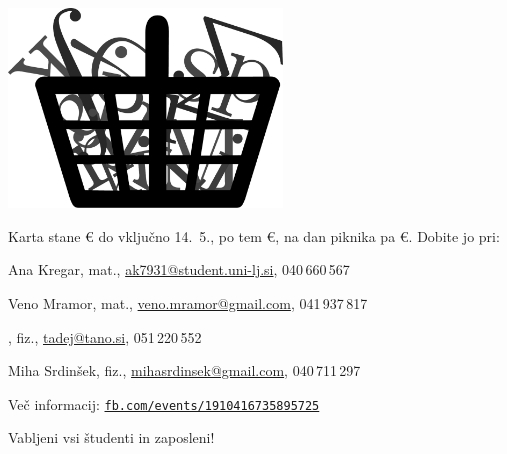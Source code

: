 \documentclass[a4paper,oneside,12pt]{article}
\title{\Title}
\author{\Author}
\date{\today}
\theoremstyle{definition}
\newenvironment{itemize*}{\vspace{-6pt}\begin{itemize}\setlength{\itemsep}{0pt}\setlength{\parskip}{2pt}}{\end{itemize}}
\begin{document}
\vspace*{-10ex}

\begin{center}
\fontsize{64}{64}\selectfont
{}\scalebox{2.6}{$\boldsymbol \varphi$}\textbf{} \\[28px]

\vspace*{1ex}

\fontsize{36}{55}\selectfont
{}\mbox{
 }

\fontsize{32}{36}\selectfont

\vspace*{-0.5ex}
\includegraphics[height=150pt]{piknik_logo.pdf}

\vspace{-1ex}
\begin{flushleft}
  Karta stane \unit[10]{\euro} do vključno 14.~5., po tem
  \unit[12]{\euro}, na dan piknika pa \unit[15]{\euro}. Dobite jo pri:
\end{flushleft}
\fontsize{18}{20}\selectfont
\vspace{-3.5ex}
\begin{itemize*}
  \item Ana Kregar, mat.,
    \href{mailto:ak7931@student.uni-lj.si}{ak7931@student.uni-lj.si},
    040\,660\,567
  \item Veno Mramor, mat., \href{mailto:veno.mramor@gmail.com}{veno.mramor@gmail.com}, 041\,937\,817
  \item , fiz., \href{mailto:tadej@tano.si}{tadej@tano.si}, 051\,220\,552
  \item Miha Srdinšek, fiz.,
    \href{mailto:mihasrdinsek@gmail.com}{mihasrdinsek@gmail.com},
    040\,711\,297
\end{itemize*}

\vspace{-2ex}

\fontsize{18}{20}\selectfont
Več informacij:
\href{https://www.facebook.com/events/1910416735895725/}{\texttt{fb.com/events/1910416735895725}}

\fontsize{36}{36}\selectfont
\vspace*{-1ex}
Vabljeni vsi študenti in zaposleni!

\end{center}
\end{document}
